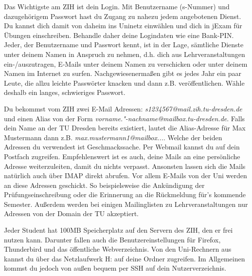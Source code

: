 

Das Wichtigste am ZIH ist dein Login.
Mit Benutzername (s-Nummer) und dazugehörigem Passwort hast du Zugang zu nahezu jedem angebotenen Dienst.
Du kannst dich damit von daheim ins Uninetz einwählen und dich in jExam für Übungen einschreiben.
Behandle daher deine Logindaten wie eine Bank-PIN.
Jeder, der Benutzername und Passwort kennt, ist in der Lage, sämtliche Dienste unter deinem Namen in Anspruch zu nehmen, d.h. dich aus Lehrveranstaltungen ein-/auszutragen, E-Mails unter deinem Namen zu verschicken oder unter deinem Namen im Internet zu surfen.
Nachgewiesenermaßen gibt es jedes Jahr ein paar Leute, die allzu leichte Passwörter knacken und dann z.B. veröffentlichen.
Wähle deshalb ein langes, schwieriges Passwort.

Du bekommst vom ZIH zwei E-Mail Adressen:
\textit{s1234567@mail.zih.tu-dresden.de} und einen Alias von der Form \textit{vorname."-nachname@mailbox.tu-dresden.de}.
Falls dein Name an der TU Dresden bereits existiert, lautet die Alias-Adresse für Max Mustermann dann z.B. \textit{max.mustermann1@mailbox...}.
Welche der beiden Adressen du verwendest ist Geschmackssache.
Per Webmail kannst du auf dein Postfach zugreifen.
Empfehlenswert ist es auch, deine Mails an eine persönliche Adresse weiterzuleiten, damit du nichts verpasst.
Ansonsten lassen sich die Mails natürlich auch über IMAP direkt abrufen.
Vor allem E-Mails von der Uni werden an diese Adressen geschickt.
So beispielsweise die Ankündigung der Prüfungseinschreibung oder die Erinnerung an die Rückmeldung für's kommende Semester.
Außerdem werden bei einigen Mailinglisten zu Lehrveranstaltungen nur Adressen von der Domain der TU akzeptiert.

Jeder Student hat 100MB Speicherplatz auf den Servern des ZIH, den er frei nutzen kann.
Darunter fallen auch die Benutzereinstellungen für Firefox, Thunderbird und das öffentliche Webverzeichnis.
Von den Uni-Rechnern aus kannst du über das Netzlaufwerk H: auf deine Ordner zugreifen.
Im Allgemeinen kommst du jedoch von außen bequem per SSH auf dein Nutzerverzeichnis.


